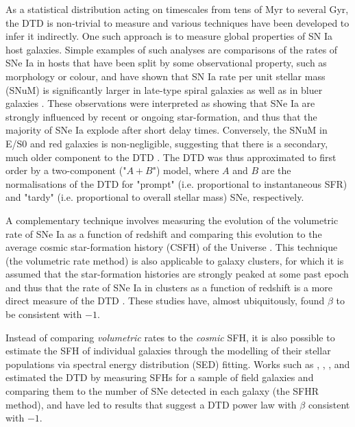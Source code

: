 \documentclass[fleqn,usenatbib]{mnras}
\begin{document}
As a statistical distribution acting on timescales from tens of Myr to several Gyr, the DTD is non-trivial to measure and various techniques have been developed to infer it indirectly. One such approach is to measure global properties of SN Ia host galaxies. Simple examples of such analyses are comparisons of the rates of SNe Ia in hosts that have been split by some observational property, such as morphology or colour, and have shown that SN Ia rate per unit stellar mass (SNuM) is significantly larger in late-type spiral galaxies as well as in bluer galaxies \citep[e.g.][]{Mannucci2005}. These observations were interpreted as showing that SNe Ia are strongly influenced by recent or ongoing star-formation, and thus that the majority of SNe Ia explode after short delay times. Conversely, the SNuM in E/S0 and red galaxies is non-negligible, suggesting that there is a secondary, much older component to the DTD \citep{Sullivan2006,Li2011a,Smith2012}. The DTD was thus approximated to first order by a two-component ("$A + B$") model, where $A$ and $B$ are the normalisations of the DTD for "prompt" (i.e. proportional to instantaneous SFR) and "tardy" (i.e. proportional to overall stellar mass) SNe, respectively.

A complementary technique involves measuring the evolution of the volumetric rate of SNe Ia as a function of redshift and comparing this evolution to the average cosmic star-formation history (CSFH) of the Universe \citep{Gal-Yam2004,Strolger2004,Dahlen2004,Dahlen2008, Graur2011,Graur2013, Rodney2014,Frohmaier2019}. This technique (the volumetric rate method) is also applicable to galaxy clusters, for which it is assumed that the star-formation histories are strongly peaked at some past epoch and thus that the rate of SNe Ia in clusters as a function of redshift is a more direct measure of the DTD \citep{Maoz2004,Maoz2010,Friedman2018,Freundlich2020}. These studies have, almost ubiquitously, found $\beta$ to be consistent with $-1$.

Instead of comparing \textit{volumetric} rates to the \textit{cosmic} SFH, it is also possible to estimate the SFH of individual galaxies through the modelling of their stellar populations via spectral energy distribution (SED) fitting. Works such as \citet{Maoz2011}, \citet{Maoz2012}, \citet{Graur2013}, and \citet{Graur2015} estimated the DTD by measuring SFHs for a sample of field galaxies and comparing them to the number of SNe detected in each galaxy (the SFHR method), and have led to results that suggest a DTD power law with $\beta$ consistent with $-1$. 
\end{document}
